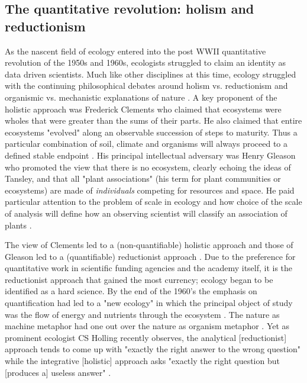 \subsection{The quantitative revolution: holism and reductionism}

As the nascent field of ecology entered into the post WWII quantitative revolution of the 1950s and 1960s, ecologists struggled to claim an identity as data driven scientists. Much like other disciplines at this time, ecology struggled with the continuing philosophical debates around holism vs. reductionism and organismic vs. mechanistic explanations of nature \citep{barbour_1996}. A key proponent of the holistic approach was Frederick Clements who claimed that ecosystems were wholes that were greater than the sums of their parts. He also claimed that entire ecosystems "evolved" along an observable succession of steps to maturity. Thus a particular combination of soil, climate and organisms will always proceed to a defined stable endpoint \citep{clements_1936}. His principal intellectual adversary was Henry Gleason who promoted the view that there is no ecosystem, clearly echoing the ideas of Tansley, and that all "plant associations" (his term for plant communities or ecosystems) are made of \textit{individuals} competing for resources and space. He paid particular attention to the problem of scale in ecology and how choice of the scale of analysis will define how an observing scientist will classify an association of plants \citep{gleason_1939}. 

The view of Clements led to a (non-quantifiable) holistic approach and those of Gleason led to a (quantifiable) reductionist approach \citep{barbour_1996,worster_1977}. Due to the preference for quantitative work in scientific funding agencies and the academy itself, it is the reductionist approach that gained the most currency; ecology began to be identified as a hard science. By the end of the 1960's the emphasis on quantification had led to a "new ecology" in which the principal object of study was the flow of energy and nutrients through the ecosystem \citep{worster_1977, barbour_1996}. The nature as machine metaphor had one out over the nature as organism metaphor \citep{hagen_1992}. Yet as prominent ecologist CS Holling recently observes, the analytical [reductionist] approach tends to come up with "exactly the right answer to the wrong question" while the integrative [holistic] approach asks "exactly the right question but [produces a] useless answer" \citep[][p. 3]{holling_1998}.


